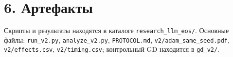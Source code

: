 \documentclass[10pt,a4paper]{article}
\begin{document}
\section*{6. Артефакты}

Скрипты и результаты находятся в каталоге
\texttt{research\_llm\_eos/}. Основные файлы: \texttt{run\_v2.py},
\texttt{analyze\_v2.py}, \texttt{PROTOCOL.md}, \texttt{v2/adam\_same\_seed.pdf},
\texttt{v2/effects.csv}, \texttt{v2/timing.csv}; контрольный GD находится в
\texttt{gd\_v2/}.
\end{document}
